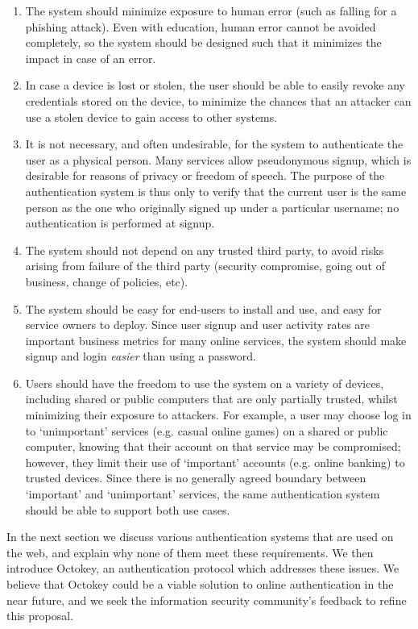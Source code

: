 \begin{enumerate}
\item The system should minimize exposure to human error (such as falling for a phishing attack).
Even with education, human error cannot be avoided completely, so the system should be designed such
that it minimizes the impact in case of an error.
\item In case a device is lost or stolen, the user should be able to easily revoke any credentials
stored on the device, to minimize the chances that an attacker can use a stolen device to gain
access to other systems.
\item It is not necessary, and often undesirable, for the system to authenticate the user as a
physical person. Many services allow pseudonymous signup, which is desirable for reasons of privacy
or freedom of speech. The purpose of the authentication system is thus only to verify that the
current user is the same person as the one who originally signed up under a particular username; no
authentication is performed at signup.
\item The system should not depend on any trusted third party, to avoid risks arising from failure
of the third party (security compromise, going out of business, change of policies, etc).
\item The system should be easy for end-users to install and use, and easy for service owners to
deploy. Since user signup and user activity rates are important business metrics for many online
services, the system should make signup and login \emph{easier} than using a password.
\item Users should have the freedom to use the system on a variety of devices, including shared or
public computers that are only partially trusted, whilst minimizing their exposure to attackers.
For example, a user may choose log in to `unimportant' services (e.g. casual online games) on a
shared or public computer, knowing that their account on that service may be compromised; however,
they limit their use of `important' accounts (e.g. online banking) to trusted devices. Since there
is no generally agreed boundary between `important' and `unimportant' services, the same
authentication system should be able to support both use cases.
\end{enumerate}

In the next section we discuss various authentication systems that are used on the web, and explain
why none of them meet these requirements. We then introduce Octokey, an authentication protocol
which addresses these issues. We believe that Octokey could be a viable solution to online
authentication in the near future, and we seek the information security community's feedback to
refine this proposal.

